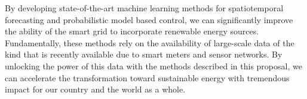\documentclass[12pt]{article}
\begin{document}
By developing state-of-the-art machine learning methods for spatiotemporal forecasting and probabilistic model based control, we can significantly improve the ability of the smart grid to incorporate renewable energy sources. Fundamentally, these methods rely on the availability of large-scale data of the kind that is recently available due to smart meters and sensor networks. By unlocking the power of this data with the methods described in this proposal, we can accelerate the transformation toward sustainable energy with tremendous impact for our country and the world as a whole.



\end{document}
